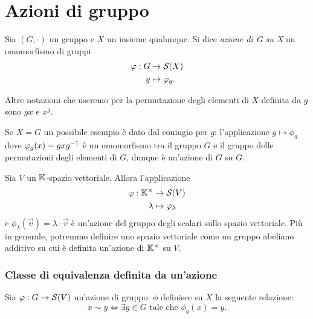 \section{Azioni di gruppo}

\begin{definition}
     Sia $(G, \cdot)$ un gruppo e $X$ un insieme qualunque. Si dice \emph{azione di G su X} un omomorfismo di gruppi \begin{align*}
        \varphi : G &\to \mathcal{S}(X)\\
        g &\mapsto \varphi_g.
    \end{align*}
\end{definition}

Altre notazioni che useremo per la permutazione degli elementi di $X$ definita da $g$ sono $gx$ e $x^g$.

\begin{example}
    Se $X = G$ un possibile esempio è dato dal coniugio per $g$: l'applicazione $g \mapsto \phi_g$ dove $\varphi_g(x) = gxg^{-1}$ è un omomorfismo tra il gruppo $G$ e il gruppo delle permutazioni degli elementi di $G$, dunque è un'azione di $G$ su $G$.
\end{example}
\begin{example}
    Sia $V$ un $\mathbb{K}$-spazio vettoriale. Allora l'applicazione \begin{align*}
        \varphi : \mathbb{K}^{\times} &\to \mathcal{S}(V)\\
        \lambda &\mapsto \varphi_\lambda
    \end{align*} e $\phi_\lambda(\vec{v}) = \lambda\cdot \vec v$ è un'azione del gruppo degli scalari sullo spazio vettoriale. Più in generale, potremmo definire uno spazio vettoriale come un gruppo abeliano additivo su cui è definita un'azione di $\mathbb{K}^{\times}$ su $V$.
\end{example}

\subsubsection{Classe di equivalenza definita da un'azione}
Sia $\varphi : G \to \mathcal{S}(V)$ un'azione di gruppo. $\phi$ definisce su $X$ la seguente relazione: \begin{equation}\label{eq:eq_rel_group_action}
    x \sim y \iff \exists g \in G \text{ tale che } \phi_g(x) = y.    
\end{equation}

